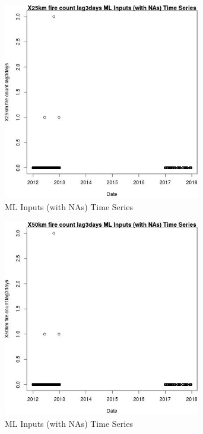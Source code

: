 \begin{figure} 
\centering  
\includegraphics[width=0.77\textwidth]{Code_Outputs/Report_ML_input_PM25_Step4_part_e_de_duplicated_aves_compiled_2019-05-14wNAs_X25km_fire_count_lag3daysvDate.jpg} 
\caption{\label{fig:Report_ML_input_PM25_Step4_part_e_de_duplicated_aves_compiled_2019-05-14wNAsX25km_fire_count_lag3daysvDate}ML Inputs (with NAs) Time Series} 
\end{figure} 
 

\begin{figure} 
\centering  
\includegraphics[width=0.77\textwidth]{Code_Outputs/Report_ML_input_PM25_Step4_part_e_de_duplicated_aves_compiled_2019-05-14wNAs_X50km_fire_count_lag3daysvDate.jpg} 
\caption{\label{fig:Report_ML_input_PM25_Step4_part_e_de_duplicated_aves_compiled_2019-05-14wNAsX50km_fire_count_lag3daysvDate}ML Inputs (with NAs) Time Series} 
\end{figure} 
 

